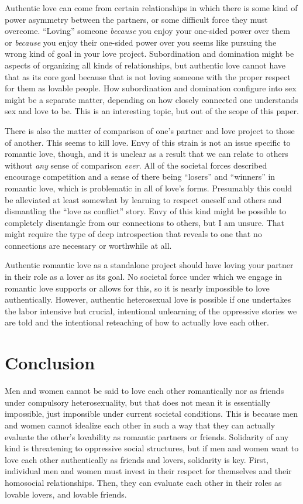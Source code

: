 Authentic love can come from certain relationships in which there is
some kind of power asymmetry between the partners, or some difficult
force they must overcome. ``Loving'' someone \emph{because} you enjoy
your one-sided power over them or \emph{because} you enjoy their
one-sided power over you seems like pursuing the wrong kind of goal in
your love project. Subordination and domination might be aspects of
organizing all kinds of relationships, but authentic love cannot have
that as its core goal because that is not loving someone with the proper
respect for them as lovable people. How subordination and domination
configure into sex might be a separate matter, depending on how closely
connected one understands sex and love to be. This is an interesting
topic, but out of the scope of this paper.

There is also the matter of comparison of one's partner and love project
to those of another. This seems to kill love. Envy of this strain is not
an issue specific to romantic love, though, and it is unclear as a
result that we can relate to others without \emph{any} sense of
comparison \emph{ever}. All of the societal forces described encourage
competition and a sense of there being ``losers'' and ``winners'' in
romantic love, which is problematic in all of love's forms. Presumably
this could be alleviated at least somewhat by learning to respect
oneself and others and dismantling the ``love as conflict'' story. Envy
of this kind might be possible to completely disentangle from our
connections to others, but I am unsure. That might require the type of
deep introspection that reveals to one that no connections are necessary
or worthwhile at all.

Authentic romantic love as a standalone project should have loving your
partner in their role as a lover as its goal. No societal force under
which we engage in romantic love supports or allows for this, so it is
nearly impossible to love authentically. However, authentic heterosexual
love is possible if one undertakes the labor intensive but crucial,
intentional unlearning of the oppressive stories we are told and the
intentional reteaching of how to actually love each other.

\section{Conclusion}

Men and women cannot be said to love each other romantically nor as
friends under compulsory heterosexuality, but that does not mean it is
essentially impossible, just impossible under current societal
conditions. This is because men and women cannot idealize each other in
such a way that they can actually evaluate the other's lovability as
romantic partners or friends. Solidarity of any kind is threatening to
oppressive social structures, but if men and women want to love each
other authentically as friends and lovers, solidarity is key. First,
individual men and women must invest in their respect for themselves and
their homosocial relationships. Then, they can evaluate each other in
their roles as lovable lovers, and lovable friends.


